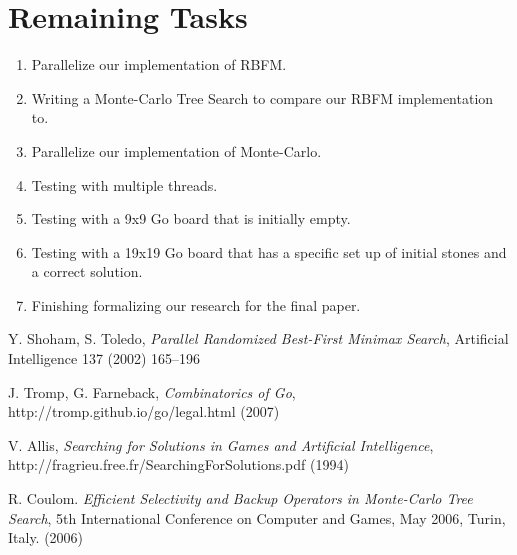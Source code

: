 \documentclass[conference]{IEEEtran}
\begin{document}
\section{Remaining Tasks}
\begin{enumerate}
  \item Parallelize our implementation of RBFM.
  \item Writing a Monte-Carlo Tree Search to compare our RBFM implementation to.
  \item Parallelize our implementation of Monte-Carlo.
  \item Testing with multiple threads.
  \item Testing with a 9x9 Go board that is initially empty.
  \item Testing with a 19x19 Go board that has a specific  set up of initial stones and a correct solution.
  \item Finishing formalizing our research for the final paper.
\end{enumerate}

\begin{thebibliography}{1}

Y. Shoham, S. Toledo, \emph{Parallel Randomized Best-First Minimax Search},  Artificial Intelligence 137 (2002) 165--196

J. Tromp, G. Farneback, \emph{Combinatorics of Go},
http://tromp.github.io/go/legal.html (2007)

V. Allis, \emph{Searching for Solutions in Games and Artificial Intelligence},
http://fragrieu.free.fr/SearchingForSolutions.pdf (1994)

R. Coulom.  \emph{Efficient Selectivity and Backup Operators in Monte-Carlo Tree Search}, 5th International Conference on Computer and Games, May 2006, Turin, Italy. (2006)

\end{thebibliography}
\end{document}

